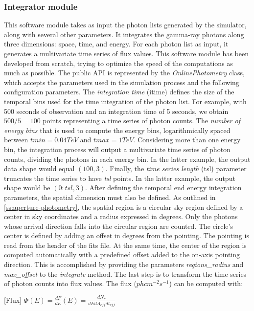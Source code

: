 \subsubsection{Integrator module}
\label{ss:integrator-module}
This software module takes as input the photon lists generated by the simulator, along with several other parameters. It integrates the gamma-ray photons along three dimensions: space, time, and energy. For each photon list as input, it generates a multivariate time series of flux values. This software module has been developed from scratch, trying to optimize the speed of the computations as much as possible. 
The public API is represented by the \textit{OnlinePhotometry} class, which accepts the parameters used in the simulation process and the following configuration parameters. The \textit{integration time} (itime) defines the size of the temporal bins used for the time integration of the photon list. For example, with 500 seconds of observation and an integration time of 5 seconds, we obtain $500/5=100$ points representing a time series of photon counts. The \textit{number of energy bins} that is used to compute the energy bins, logarithmically spaced between $tmin=0.04 TeV$ and $tmax=1 TeV$. Considering more than one energy bin, the integration process will output a multivariate time series of photon counts, dividing the photons in each energy bin. In the latter example, the output data shape would equal $(100,3)$. Finally, the \textit{time series length} (tsl) parameter truncates the time series to have \textit{tsl} points. In the latter example, the output shape would be $(0:tsl, 3)$. After defining the temporal end energy integration parameters, the spatial dimension must also be defined. As outlined in \autoref{ss:aperture-photometry}, the spatial region is a circular sky region defined by a center in sky coordinates and a radius expressed in degrees. Only the photons whose arrival direction falls into the circular region are counted. The circle's center is defined by adding an offset in degrees from the pointing. The pointing is read from the header of the fits file. At the same time, the center of the region is computed automatically with a predefined offset added to the on-axis pointing direction. This is accomplished by providing the parameters \textit{regions\_radius} and \textit{max\_offset} to the \textit{integrate} method. The last step is to transform the time series of photon counts into flux values. 
The flux ($ph cm^{-2} s^{-1}$) can be computed with:
\begin{definition} 
\label{def:flux}
[Flux] $\Phi(E)=\frac{dF}{dE}(E)=\frac{dN_\gamma}{dE dA_{eff} dt_{eff}}$
\end{definition}
